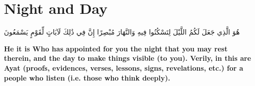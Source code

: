 \chapter{Night and Day}
\begin{center}
    {\Huge    
        \begin{Arabic}
            هُوَ الَّذِي جَعَلَ لَكُمُ اللَّيْلَ لِتَسْكُنُوا فِيهِ وَالنَّهَارَ مُبْصِرًا إِنَّ فِي ذَٰلِكَ لَآيَاتٍ لِّقَوْمٍ يَسْمَعُونَ
        \end{Arabic}
    }    
\end{center}
\vspace*{\fill}
\vspace{3cm}
\begin{center}
    \Large \textbf{He it is Who has appointed for you the night that you may rest therein, and the day to make things visible (to you). Verily, in this are Ayat (proofs, evidences, verses, lessons, signs, revelations, etc.) for a people who listen (i.e. those who think deeply).}
\end{center}
